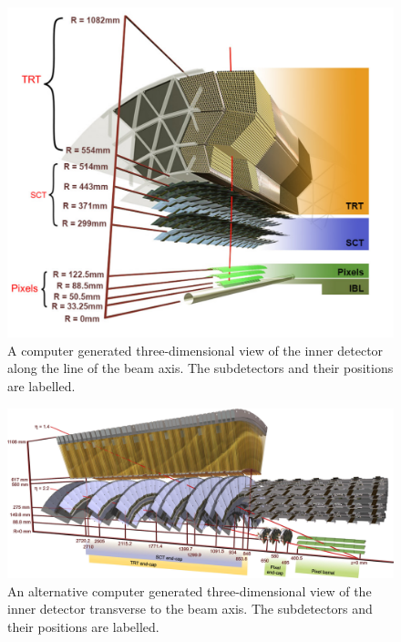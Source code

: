 \begin{figure}[hbtp]
\includegraphics[width=\fullfig]{figures/id_slice.png}
\caption{A computer generated three-dimensional view of the inner detector along the line of the beam axis. The subdetectors and their positions are labelled.}
\label{fig:id_slice}
\end{figure}


\begin{figure}[hbtp]
\includegraphics[width=\fullfig]{figures/id_slice_long.pdf}
\caption{An alternative computer generated three-dimensional view of the inner detector transverse to the beam axis. The subdetectors and their positions are labelled.}
\label{fig:id_slice_long}
\end{figure}

